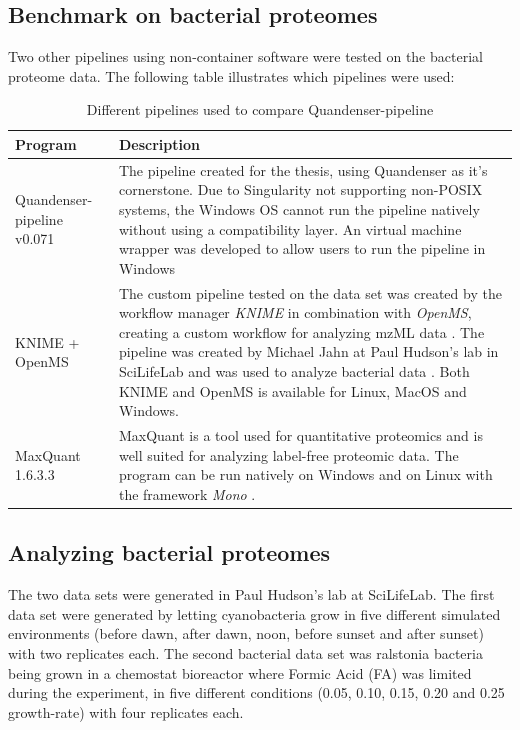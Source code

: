 \subsection{Benchmark on bacterial proteomes}  %
Two other pipelines using non-container software were tested on the bacterial proteome data. The following table illustrates which pipelines were used:

\newcommand{\textone}{\small The pipeline created for the thesis, using Quandenser as it's cornerstone. Due to Singularity not supporting non-POSIX systems, the Windows OS cannot run the pipeline natively without using a compatibility layer. An virtual machine wrapper was developed to allow users to run the pipeline in Windows}
\newcommand{\texttwo}{\small The custom pipeline tested on the data set was created by the workflow manager \textit{KNIME} in combination with \textit{OpenMS}, creating a custom workflow for analyzing mzML data \cite{knime} \cite{openms}. The pipeline was created by Michael Jahn at Paul Hudson's lab in SciLifeLab and was used to analyze bacterial data \cite{m-jahn-pipeline}. Both KNIME and OpenMS is available for Linux, MacOS and Windows.}
\newcommand{\textthree}{\small MaxQuant is a tool used for quantitative proteomics and is well suited for analyzing label-free proteomic data. The program can be run natively on Windows and on Linux with the framework \textit{Mono} \cite{maxquant} \cite{maxquant-installation}.}

\begin{table}[H]
\caption{Different pipelines used to compare Quandenser-pipeline}
\begin{center}
\begin{tabular}{|p{4cm}|p{9cm}|}
\hline
Program & Description \\ \hline \hline
Quandenser-pipeline v0.071 & \textone \\ \hline
KNIME + OpenMS & \texttwo \\ \hline
MaxQuant 1.6.3.3 & \textthree \\ \hline
\end{tabular}
\end{center}
\end{table}

\subsection{Analyzing bacterial proteomes}
The two data sets were generated in Paul Hudson's lab at SciLifeLab. The first data set were generated by letting cyanobacteria grow in five different simulated environments (before dawn, after dawn, noon, before sunset and after sunset) with two replicates each. The second bacterial data set was ralstonia bacteria being grown in a chemostat bioreactor where Formic Acid (FA) was limited during the experiment, in five different conditions (0.05, 0.10, 0.15, 0.20 and 0.25 growth-rate) with four replicates each.

